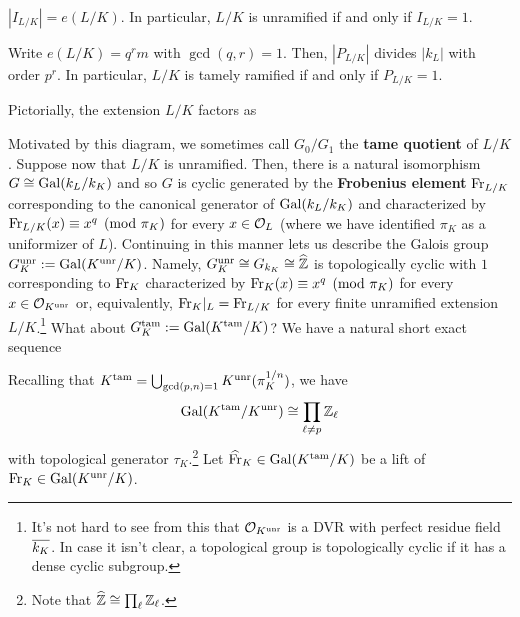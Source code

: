 \documentclass[11pt]{article}
\newcommand{\Fr}{\textup{Fr}} %
\newcommand{\tam}{\textup{tam}} %
\begin{document}
\begin{corollary}
\hfill
\begin{enum}{\alph}
\item $|I_{L/K}|=e(L/K)$. In particular, $L/K$ is unramified if and only if $I_{L/K}=1$.

\item Write $e(L/K)=q^rm$ with $\gcd(q,r)=1$. Then, $|P_{L/K}|$ divides $|k_L|$ with order $p^r$. In particular, $L/K$ is tamely ramified if and only if $P_{L/K}=1$.
\end{enum}
\end{corollary}

Pictorially, the extension $L/K$ factors as
\begin{center}
\end{center}
Motivated by this diagram, we sometimes call $G_0/G_1$ the \textbf{tame quotient} of $L/K$. Suppose now that $L/K$ is unramified. Then, there is a natural isomorphism $G\cong\operatorname{Gal}(k_L/k_K)$ and so $G$ is cyclic generated by the \textbf{Frobenius element} $\Fr_{L/K}$ corresponding to the canonical generator of $\operatorname{Gal}(k_L/k_K)$ and characterized by $\Fr_{L/K}(x)\equiv x^q\pmod{\pi_K}$ for every $x\in\mathcal{O}_L$ (where we have identified $\pi_K$ as a uniformizer of $L$). Continuing in this manner lets us describe the Galois group $G_K^{\operatorname{unr}}:=\operatorname{Gal}(K^{\operatorname{unr}}/K)$. Namely, $G_K^{\operatorname{unr}}\cong G_{k_K}\cong\widehat{\mathbb{Z}}$ is topologically cyclic with $1$ corresponding to $\Fr_K$ characterized by $\Fr_K(x)\equiv x^q\pmod{\pi_K}$ for every $x\in\mathcal{O}_{K^{\operatorname{unr}}}$ or, equivalently, $\Fr_K|_L=\Fr_{L/K}$ for every finite unramified extension $L/K$.\footnote{It's not hard to see from this that $\mathcal{O}_{K^{\operatorname{unr}}}$ is a DVR with perfect residue field $\overline{k_K}$. In case it isn't clear, a topological group is topologically cyclic if it has a dense cyclic subgroup.} What about $G_K^{\tam}:=\Gal(K^{\tam}/K)$? We have a natural short exact sequence
\begin{center}
\end{center}
Recalling that $K^{\tam}=\bigcup_{\gcd(p,n)=1}K^{\unr}(\pi_K^{1/n})$, we have 
$$\Gal(K^{\tam}/K^{\unr})\iso\prod_{\l\neq p}\Z_{\l}$$
with topological generator $\tau_K$.\footnote{Note that $\widehat{\mathbb{Z}}\cong\prod_{\ell}\mathbb{Z}_{\ell}$.} Let $\w{\Fr}_K\in\Gal(K^{\tam}/K)$ be a lift of $\Fr_K\in\Gal(K^{\unr}/K)$.
\end{document}
